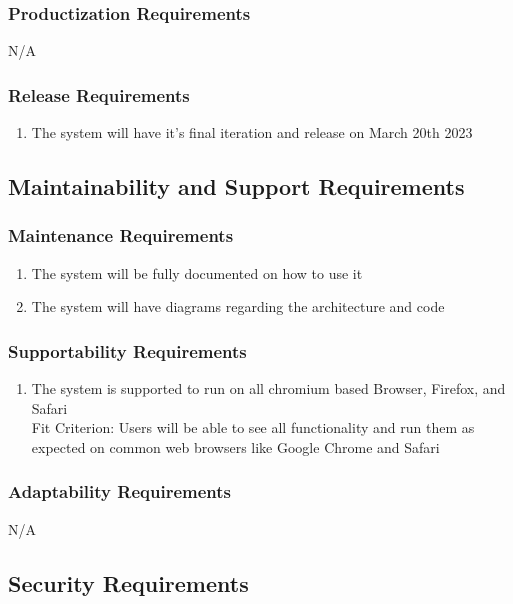 \documentclass[12pt, titlepage]{article}
\begin{document}
	\subsubsection{Productization Requirements}
	N/A
	\subsubsection{Release Requirements}
	\begin{enumerate}[resume*]
		\item The system will have it's final iteration and release on March 20th 2023
	\end{enumerate}
	\subsection{Maintainability and Support Requirements}
	\subsubsection{Maintenance Requirements}
	\begin{enumerate}[resume*]
		\item The system will be fully documented on how to use it
		\item The system will have diagrams regarding the architecture and code
	\end{enumerate}
	\subsubsection{Supportability Requirements}
	\begin{enumerate}[resume*]
		\item The system is supported to run on all chromium based Browser, Firefox, and Safari\\
		{\color{red}Fit Criterion: Users will be able to see all functionality and run them as expected on common web browsers like Google Chrome and Safari}
	\end{enumerate}
	\subsubsection{Adaptability Requirements}
	N/A
	\subsection{Security Requirements}
\end{document}
